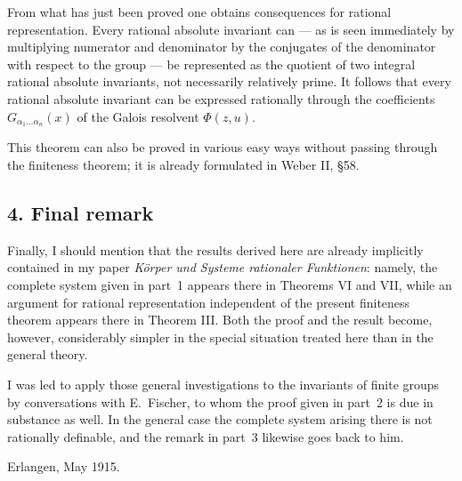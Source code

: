 \documentclass[11pt]{article}
\begin{document}
From what has just been proved one obtains consequences for rational representation. Every rational absolute invariant can --- as is seen immediately by multiplying numerator and denominator by the conjugates of the denominator with respect to the group --- be represented as the quotient of two integral rational absolute invariants, not necessarily relatively prime. It follows that every rational absolute invariant can be expressed rationally through the coefficients $G_{\alpha_1\dots\alpha_n}(x)$ of the Galois resolvent $\Phi(z,u)$.

This theorem can also be proved in various easy ways without passing through the finiteness theorem; it is already formulated in Weber II, \S 58.

\subsection*{4. Final remark}

Finally, I should mention that the results derived here are already implicitly contained in my paper \emph{Körper und Systeme rationaler Funktionen}: namely, the complete system given in part~1 appears there in Theorems VI and VII, while an argument for rational representation independent of the present finiteness theorem appears there in Theorem III. Both the proof and the result become, however, considerably simpler in the special situation treated here than in the general theory.

I was led to apply those general investigations to the invariants of finite groups by conversations with E.~Fischer, to whom the proof given in part~2 is due in substance as well. In the general case the complete system arising there is not rationally definable, and the remark in part~3 likewise goes back to him.

\begin{flushright}
Erlangen, May 1915.
\end{flushright}
\end{document}
